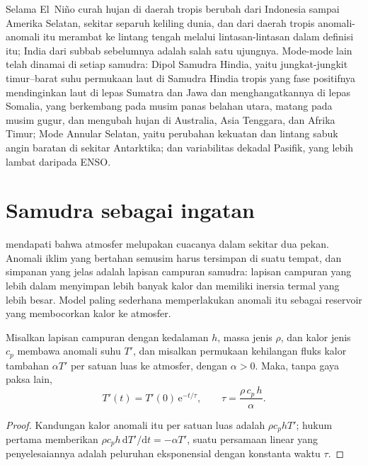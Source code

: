 Selama El~Niño curah hujan di daerah tropis berubah dari Indonesia sampai Amerika Selatan, sekitar separuh
keliling dunia, dan dari daerah tropis anomali-anomali itu merambat ke lintang tengah melalui lintasan-lintasan
dalam definisi itu;  India dari subbab sebelumnya adalah salah satu ujungnya. Mode-mode lain
telah dinamai di setiap samudra: Dipol Samudra Hindia, yaitu jungkat-jungkit timur--barat suhu permukaan
laut di Samudra Hindia tropis yang fase positifnya mendinginkan laut di lepas Sumatra dan Jawa
dan menghangatkannya di lepas Somalia, yang berkembang pada musim panas belahan utara, matang pada musim gugur, dan mengubah
hujan di Australia, Asia Tenggara, dan Afrika Timur; Mode Annular Selatan, yaitu perubahan
kekuatan dan lintang sabuk angin baratan di sekitar Antarktika; dan variabilitas dekadal
Pasifik, yang lebih lambat daripada ENSO.

\section{Samudra sebagai ingatan}\label{sec:b2:climate-variability:memory}

 mendapati bahwa atmosfer melupakan cuacanya dalam sekitar dua pekan.
Anomali iklim yang bertahan semusim harus tersimpan di suatu tempat, dan simpanan yang jelas adalah lapisan
campuran samudra: lapisan campuran yang lebih dalam menyimpan lebih banyak kalor dan memiliki inersia termal yang lebih besar. Model paling sederhana memperlakukan
anomali itu sebagai reservoir yang membocorkan kalor ke atmosfer.

\begin{proposition}\label{prop:b2:climate-variability:damping}
Misalkan lapisan campuran dengan kedalaman $h$, massa jenis $\rho$, dan kalor jenis $c_p$ membawa anomali suhu
$T'$, dan misalkan permukaan kehilangan fluks kalor tambahan $\alpha T'$ per satuan luas ke atmosfer,
dengan $\alpha > 0$. Maka, tanpa gaya paksa lain,
\[
  T'(t) = T'(0)\,\mathrm{e}^{-t/\tau}, \qquad \tau = \frac{\rho\,c_p\,h}{\alpha} .
\]
\end{proposition}

\begin{proof}
Kandungan kalor anomali itu per satuan luas adalah $\rho c_p h T'$; hukum pertama memberikan $\rho c_p h
\,\mathrm{d}T'/\mathrm{d}t = -\alpha T'$, suatu persamaan linear yang penyelesaiannya adalah peluruhan
eksponensial dengan konstanta waktu $\tau$.
\end{proof}

